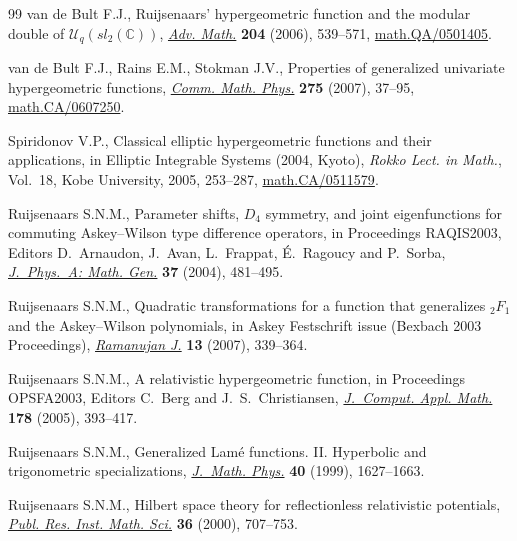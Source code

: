 \documentclass[11pt]{article}
\numberwithin{equation}{section}
\newcommand{\C}{{\mathbb C}}
\begin{document}
\begin{thebibliography}{99}
van de Bult F.J.,
Ruijsenaars' hypergeometric function and the modular double of ${\mathcal U}_q(sl_2(\C))$,
\href{http://dx.doi.org/10.1016/j.aim.2005.05.023}{{\it Adv. Math.}}  {\bf 204} (2006), 539--571,
\href{http://arxiv.org/abs/math.QA/0501405}{math.QA/0501405}.

van de Bult F.J., Rains E.M., Stokman J.V.,
Properties of generalized univariate hypergeometric functions,
\href{http://dx.doi.org/10.1007/s00220-007-0289-0}{{\it Comm. Math. Phys.}} {\bf 275} (2007), 37--95,
\href{http://arxiv.org/abs/math.CA/0607250}{math.CA/0607250}.

Spiridonov V.P.,
Classical elliptic hypergeometric functions and their applications,
in Elliptic Integrable Systems (2004, Kyoto),
{\it Rokko Lect. in Math.}, Vol.~18,   Kobe University,   2005, 253--287,
\href{http://arxiv.org/abs/math.CA/0511579}{math.CA/0511579}.

Ruijsenaars S.N.M.,
Parameter shifts, $D_4$ symmetry, and joint  eigenfunctions for commuting  Askey--Wilson type dif\/ference operators,
 in Proceedings RAQIS2003, Editors D.~Arnaudon, J.~Avan,  L.~Frappat, \'E.~Ragoucy  and
P.~Sorba,
\href{http://dx.doi.org/10.1088/0305-4470/37/2/016}{{\it J.~Phys.~A: Math. Gen.}} {\bf 37} (2004), 481--495.

Ruijsenaars S.N.M.,
Quadratic transformations for a function that generalizes ${}_2F_1$ and the Askey--Wilson polynomials,
in Askey Festschrift issue (Bexbach 2003 Proceedings),
\href{http://dx.doi.org/10.1007/s11139-006-0257-x}{{\it Ramanujan J.}} {\bf 13} (2007), 339--364.

Ruijsenaars S.N.M.,
A relativistic hypergeometric function,
in  Proceedings OPSFA2003,
Editors C.~Berg and J.~S.~Christiansen,
\href{http://dx.doi.org/10.1016/j.cam.2004.05.024}{{\it J.~Comput. Appl. Math.}} {\bf 178} (2005), 393--417.


Ruijsenaars S.N.M.,
Generalized Lam\'e functions. II. Hyperbolic and trigonometric specializations,
\href{http://dx.doi.org/10.1063/1.532823}{{\it J.~Math. Phys.}} {\bf 40} (1999),  1627--1663.

Ruijsenaars S.N.M.,
Hilbert space theory for ref\/lectionless relativistic potentials,
\href{http://dx.doi.org/10.2977/prims/1195139643}{{\it Publ. Res. Inst. Math. Sci.}} {\bf 36} (2000), 707--753.



\end{thebibliography}
\end{document}
